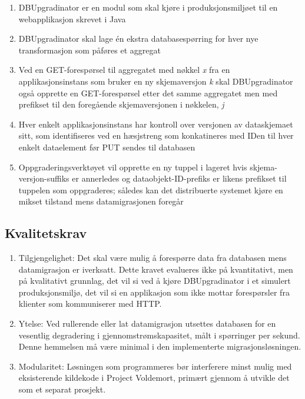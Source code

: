 \begin{enumerate}
  \item DBUpgradinator er en modul som skal kjøre i produksjonsmiljøet til en webapplikasjon skrevet i Java
  \item DBUpgradinator skal lage én ekstra databasespørring for hver nye transformasjon som påføres et aggregat
  \item Ved en GET-forespørsel til aggregatet med nøkkel \emph{x} fra en applikasjonsinstans som bruker en ny skjemaversjon \emph{k} skal DBUpgradinator også opprette en GET-forespørsel etter det samme aggregatet men med prefikset til den foregående skjemaversjonen i nøkkelen, \emph{j}
  \item Hver enkelt applikasjonsinstans har kontroll over versjonen av dataskjemaet sitt, som identifiseres ved en hæsjstreng som konkatineres med IDen til hver enkelt dataelement før PUT sendes til databasen
  \item Oppgraderingsverktøyet vil opprette en ny tuppel i lageret hvis skjema-versjon-suffiks er annerledes og dataobjekt-ID-prefiks er likens prefikset til tuppelen som oppgraderes; således kan det distribuerte systemet kjøre en mikset tilstand mens datamigrasjonen foregår
\end{enumerate}

\subsection{Kvalitetskrav}

\begin{enumerate}
  \item Tilgjengelighet: Det skal være mulig å forespørre data fra databasen mens datamigrasjon er iverksatt. Dette kravet evalueres ikke på kvantitativt, men på kvalitativt grunnlag, det vil si ved å kjøre DBUpgradinator i et simulert produksjonsmiljø, det vil si en applikasjon som ikke mottar forespørsler fra klienter som kommuniserer med HTTP.
  \item Ytelse: Ved rullerende eller lat datamigrasjon utsettes databasen for en vesentlig degradering i gjennomstrømskapasitet, målt i spørringer per sekund. Denne hemmelsen må være minimal i den implementerte migrasjonsløsningen.
  \item Modularitet: Løsningen som programmeres bør interferere minst mulig med eksisterende kildekode i Project Voldemort, primært gjennom å utvikle det som et separat prosjekt.
\end{enumerate}
